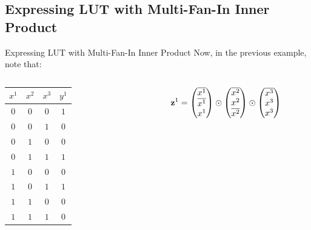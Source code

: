 \documentclass[../240906_cryptlab_flute.tex]{subfiles}
\begin{document}
\subsection{Expressing LUT with Multi-Fan-In Inner Product}
\begin{frame}{Expressing LUT with Multi-Fan-In Inner Product}
    Now, in the previous example, note that:
    \begin{columns}
        \begin{column}{.4\textwidth}
            \begin{table}[H]
                \centering
                \begin{tabular}{ccc|c}
                \(x^1\) & \(x^2\) & \(x^3\) & \(y^1\) \\ \hline
                \(0\)   & \(0\)   & \(0\)   & \(1\)   \\
                \(0\)   & \(0\)   & \(1\)   & \(0\)   \\
                \(0\)   & \(1\)   & \(0\)   & \(0\)   \\
                \(0\)   & \(1\)   & \(1\)   & \(1\)   \\
                \(1\)   & \(0\)   & \(0\)   & \(0\)   \\
                \(1\)   & \(0\)   & \(1\)   & \(1\)   \\
                \(1\)   & \(1\)   & \(0\)   & \(0\)   \\
                \(1\)   & \(1\)   & \(1\)   & \(0\)  
                \end{tabular}
            \end{table}
        \end{column}
        \begin{column}{.5\textwidth}
            \small
            \begin{align*}
                \vec{z}^1
                &= \begin{pmatrix} \ol{x^1} \\ \ol{x^1} \\ x^1 \end{pmatrix}
                   \odot \begin{pmatrix} \ol{x^2} \\ x^2 \\ \ol{x^2} \end{pmatrix}
                   \odot \begin{pmatrix} \ol{x^3} \\ x^3 \\ x^3 \end{pmatrix} \\

\end{align*}
\end{column}
\end{columns}
\end{frame}
\end{document}
